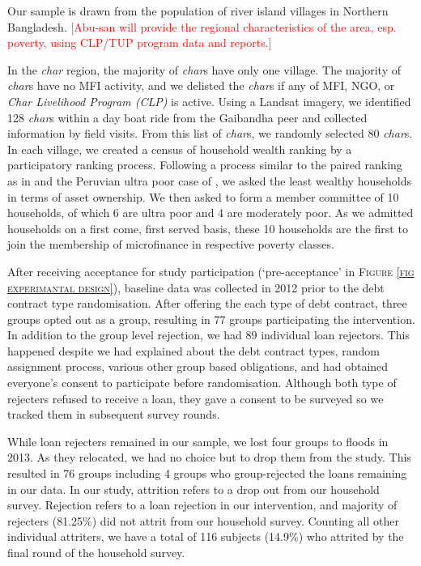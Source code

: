 	Our sample is drawn from the population of river island villages in Northern Bangladesh. 
	\textcolor{red}{[Abu-san will provide the regional characteristics of the area, esp. poverty, using CLP/TUP program data and reports.]}
	
	In the \textit{char} region, the majority of \textit{char}s have only one village. The majority of \textit{char}s have no MFI activity, and we delisted the \textit{char}s if any of MFI, NGO, or \textit{Char Livelihood Program (CLP)} is active. Using a Landsat imagery, we identified 128 \textit{char}s within a day boat ride from the Gaibandha peer and collected information by field visits. From this list of \textit{char}s, we randomly selected 80 \textit{char}s. In each village, we created a census of household wealth ranking by a participatory ranking process. Following a process similar to the paired ranking as in \citet[][p.1212]{Alatas2012} and the Peruvian ultra poor case of \citet[][p.66]{KarlanThuysbaert2019}, we asked the least wealthy households in terms of asset ownership. We then asked to form a member committee of 10 households, of which 6 are ultra poor and 4 are moderately poor.  As we admitted households on a first come, first served basis, these 10 households are the first to join the membership of microfinance in respective poverty classes. %
	
	After receiving acceptance for study participation (`pre-acceptance' in \textsc{\normalsize Figure \ref{fig experimantal design}}), baseline data was collected in 2012 prior to the debt contract type randomisation. After offering the each type of debt contract, three groups opted out as a group, resulting in 77 groups participating the intervention. In addition to the group level rejection, we had 89 individual loan rejectors. This happened despite we had explained about the debt contract types, random assignment process, various other group based obligations, and had obtained everyone's consent to participate before randomisation. Although both type of rejecters refused to receive a loan, they gave a consent to be surveyed so we tracked them in subsequent survey rounds.

	While loan rejecters remained in our sample, we lost four groups to floods in 2013. As they relocated, we had no choice but to drop them from the study. This resulted in 76 groups including 4 groups who group-rejected the loans remaining in our data. In our study, attrition refers to a drop out from our household survey. Rejection refers to a loan rejection in our intervention, and majority of rejecters (81.25\%) did not attrit from our household survey. Counting all other individual attriters, we have a total of 116 subjects (14.9\%) who attrited by the final round of the household survey. 

